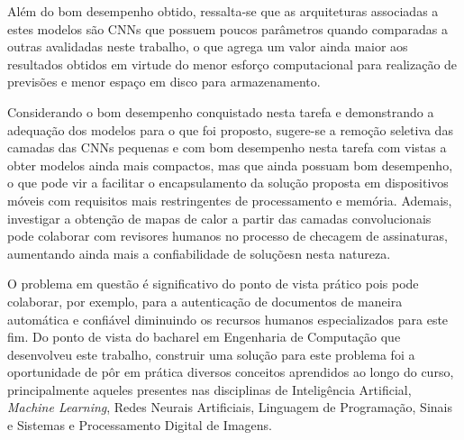 Além do bom desempenho obtido, ressalta-se que as arquiteturas associadas a estes modelos são CNNs que possuem poucos parâmetros quando comparadas a outras avalidadas neste trabalho, o que agrega um valor ainda maior aos resultados obtidos em virtude do menor esforço computacional para realização de previsões e menor espaço em disco para armazenamento.

Considerando o bom desempenho conquistado nesta tarefa e demonstrando a adequação dos modelos para o que foi proposto, sugere-se a remoção seletiva das camadas das CNNs pequenas e com bom desempenho nesta tarefa com vistas a obter modelos ainda mais compactos, mas que ainda possuam bom desempenho, o que pode vir a facilitar o encapsulamento da solução proposta em dispositivos móveis com requisitos mais restringentes de processamento e memória. Ademais, investigar a obtenção de mapas de calor a partir das camadas convolucionais pode colaborar com revisores humanos no processo de checagem de assinaturas, aumentando ainda mais a confiabilidade de soluçõesn nesta natureza.

O problema em questão é significativo do ponto de vista prático pois pode colaborar, por exemplo, para a autenticação de documentos de maneira automática e confiável diminuindo os recursos humanos especializados para este fim. Do ponto de vista do bacharel em Engenharia de Computação que desenvolveu este trabalho, construir uma solução para este problema foi a oportunidade de pôr em prática diversos conceitos aprendidos ao longo do curso, principalmente aqueles presentes nas disciplinas de Inteligência Artificial, \emph{Machine Learning}, Redes Neurais Artificiais, Linguagem de Programação, Sinais e Sistemas e Processamento Digital de Imagens.
